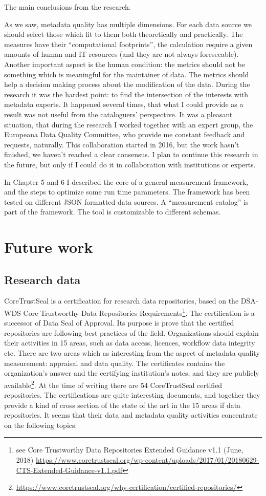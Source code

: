 The main conclusions from the research.

As we saw, metadata quality has multiple dimensions. For each data source we should select those which fit to them both theoretically and practically. The measures have their ``computational footprints'', the calculation require a given amounts of human and IT resources (and they are not always foreseeable). Another important aspect is the human condition: the metrics should not be something which is meaningful for the maintainer of data. The metrics should help a decision making process about the modification of the data. During the research it was the hardest point: to find the intersection of the interests with metadata experts. It happened several times, that what I could provide as a result was not useful from the cataloguers' perspective. It was a pleasant situation, that during the research I worked together with an expert group, the Europeana Data Quality Committee, who provide me constant feedback and requests, naturally. This collaboration started in 2016, but the work hasn't finished, we haven't reached a clear consensus. I plan to continue this research in the future, but only if I could do it in collaboration with institutions or experts.

In Chapter 5 and 6 I described the core of a general measurement framework, and the steps to optimize some run time parameters. The framework has been tested on different JSON formatted data sources. A ``measurement catalog'' is part of the framework. The tool is customizable to different schemas. 

\section{Future work}

\subsection{Research data}

CoreTrustSeal is a certification for research data repositories, based on the DSA-WDS Core Trustworthy Data Repositories Requirements\footnote{see Core Trustworthy Data Repositories Extended Guidance v1.1 (June, 2018) \url{https://www.coretrustseal.org/wp-content/uploads/2017/01/20180629-CTS-Extended-Guidance-v1.1.pdf}}. The certification is a successor of Data Seal of Approval. Its purpose is prove that the certified repositories are following best practices of the field. Organizations should explain their activities in 15 areas, such as data access, licences, workflow data integrity etc. There are two areas which as interesting from the aspect of metadata quality measurement: appraisal and data quality. The certificates contains the organization's answer and the certifying institution's notes, and they are publicly available\footnote{\url{https://www.coretrustseal.org/why-certification/certified-repositories/}}. At the time of writing there are 54 CoreTrustSeal certified repositories. The certifications are quite interesting documents, and together they provide a kind of cross section of the state of the art in the 15 areas if data repositories. It seems that their data and metadata quality activities concentrate on the following topics:

